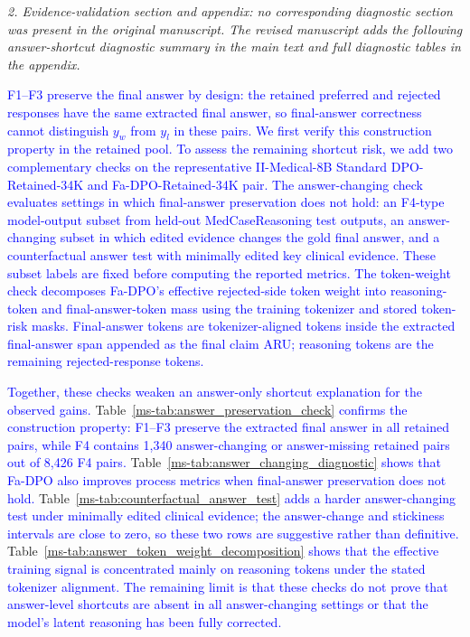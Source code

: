 \documentclass[12pt]{article}
\newcommand{\added}[1]{\textcolor{blue}{#1}}
\begin{document}
\textit{2. Evidence-validation section and appendix: no corresponding diagnostic section was present in the original manuscript. The revised manuscript adds the following answer-shortcut diagnostic summary in the main text and full diagnostic tables in the appendix.}
\begin{displayquote}
\added{F1--F3 preserve the final answer by design: the retained preferred and rejected responses have the same extracted final answer, so final-answer correctness cannot distinguish $y_w$ from $y_l$ in these pairs. We first verify this construction property in the retained pool. To assess the remaining shortcut risk, we add two complementary checks on the representative II-Medical-8B Standard DPO-Retained-34K and Fa-DPO-Retained-34K pair. The answer-changing check evaluates settings in which final-answer preservation does not hold: an F4-type model-output subset from held-out MedCaseReasoning test outputs, an answer-changing subset in which edited evidence changes the gold final answer, and a counterfactual answer test with minimally edited key clinical evidence. These subset labels are fixed before computing the reported metrics. The token-weight check decomposes Fa-DPO's effective rejected-side token weight into reasoning-token and final-answer-token mass using the training tokenizer and stored token-risk masks. Final-answer tokens are tokenizer-aligned tokens inside the extracted final-answer span appended as the final claim ARU; reasoning tokens are the remaining rejected-response tokens.}

\added{Together, these checks weaken an answer-only shortcut explanation for the observed gains.} Table~\ref*{ms-tab:answer_preservation_check} \added{confirms the construction property: F1--F3 preserve the extracted final answer in all retained pairs, while F4 contains 1,340 answer-changing or answer-missing retained pairs out of 8,426 F4 pairs.} Table~\ref*{ms-tab:answer_changing_diagnostic} \added{shows that Fa-DPO also improves process metrics when final-answer preservation does not hold.} Table~\ref*{ms-tab:counterfactual_answer_test} \added{adds a harder answer-changing test under minimally edited clinical evidence; the answer-change and stickiness intervals are close to zero, so these two rows are suggestive rather than definitive.} Table~\ref*{ms-tab:answer_token_weight_decomposition} \added{shows that the effective training signal is concentrated mainly on reasoning tokens under the stated tokenizer alignment. The remaining limit is that these checks do not prove that answer-level shortcuts are absent in all answer-changing settings or that the model's latent reasoning has been fully corrected.}
\end{displayquote}
\end{document}
